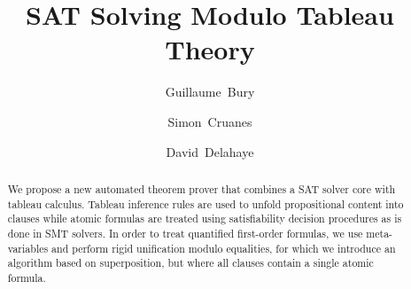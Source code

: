 \documentclass{llncs}
\begin{document}
\title{SAT Solving Modulo Tableau Theory}

\author{Guillaume~Bury \and Simon~Cruanes \and
David~Delahaye}


\maketitle

\begin{abstract}
We propose a new automated theorem prover that combines a SAT solver core with
tableau calculus. Tableau inference rules are used to unfold propositional
content into clauses while atomic formulas are treated using satisfiability
decision procedures as is done in SMT solvers. In order to treat quantified
first-order formulas, we use meta-variables and perform rigid unification modulo
equalities, for which we introduce an algorithm based on superposition, but
where all clauses contain a single atomic formula.

\end{abstract}







\end{document}
